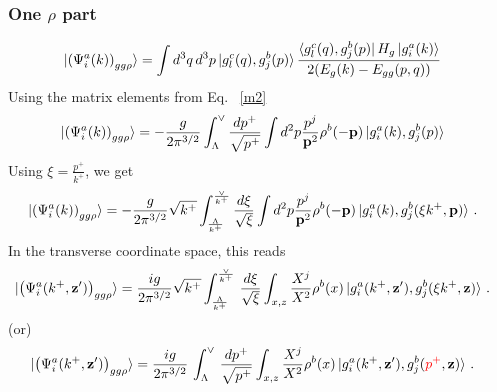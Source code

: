 \documentclass[aps,prd,amsmath,amssymb,nofootinbib]{revtex4-2}
\def\v#1{\mathbf{#1}}
\numberwithin{equation}{section}
\begin{document}
\subsubsection{One $\rho$ part}
\begin{figure}[h]
\end{figure}
\begin{align}
  \ket{ \left(\Psi^{a}_{i}(k) \right)_{gg\rho} }
   & = \int d^{3}q\, d^{3}p 
   \ket{g^{c}_{l}(q),g^{b}_{j}(p)}
 \frac{\bra{g^{c}_{l}(q),g^{b}_{j}(p)}H_{g}\ket{g^{a}_{i}(k)}}{2(E_{g}(k)-E_{gg}(p,q))}
\end{align}
Using the matrix elements from Eq.~ \eqref{m2}
\begin{align}
 \ket{ \left(\Psi^{a}_{i}(k) \right)_{gg\rho} }   & = - \frac{g}{2\pi^{3/2}} \int_{\Lambda}^{\vee} \frac{dp^+}{\sqrt{p^+}}
   \int d^2 p \frac{p^j}{\v{p}^2} \rho^b(-\v{p})
   \ket{g^{a}_{i}(k),g^{b}_{j}(p)}
\end{align}
Using $\xi = \frac{p^{+}}{k^{+}}$, we get
\begin{align}
\ket{ \left(\Psi^{a}_{i}(k) \right)_{gg\rho} }   & = - \frac{g}{2\pi^{3/2}} \sqrt{k^+} \int_{\frac{\Lambda}{k^+} }^{\frac{\vee}{k^+} } \frac{d\xi}{\sqrt{\xi}}
   \int d^2 p \frac{p^j}{\v{p}^2} \rho^b(-\v{p})
   \ket{g^{a}_{i}(k),g^{b}_{j}(\xi k^+,\v{p})}\,.
\end{align}
In the transverse coordinate space, this reads 
\begin{align}
  \notag
  \ket{ \left(\Psi^{a}_{i}(k^+, \v{z}') \right)_{gg\rho} }%
  & = \frac{ig}{2\pi^{3/2}} \sqrt{k^+} \int_{\frac{\Lambda}{k^+} }^{\frac{\vee}{k^+} }\,\frac{d\xi}{\sqrt{\xi}}
   \int_{x,z} \frac{X^j}{X^2} \rho^{b}(x)
   \ket{g^{a}_{i}(k^+,\v{z}'),g^{b}_{j}(\xi k^+,\v{z})}\,.
\end{align}
(or)
\begin{align}%
  \ket{ \left(\Psi^{a}_{i}(k^+, \v{z}') \right)_{gg\rho} }%
  & = \frac{ig}{2\pi^{3/2}}\,\int_{\Lambda}^{\vee}\, \frac{dp^+}{\sqrt{p^+}}
   \int_{x,z} \frac{X^j}{X^2} \rho^{b}(x)
   \ket{g^{a}_{i}(k^+,\v{z}'),g^{b}_{j}({\color{red}p^+},\v{z})}\,.
\end{align}
\end{document}
